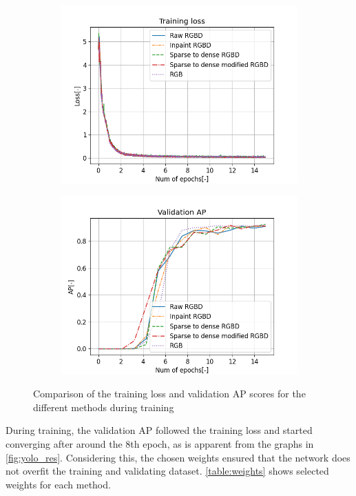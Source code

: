 \documentclass[twoside]{ctuthesis}
\theoremstyle{plain}
\theoremstyle{definition}
\theoremstyle{note}
\begin{document}
\begin{figure}
	\centering
	\begin{subfigure}[b]{0.7\textwidth}
		\centering
		\includegraphics[width=\textwidth]{train_loss.png}
	\end{subfigure}
	\hfill
	\begin{subfigure}[b]{0.7\textwidth}
		\centering
		\includegraphics[width=\textwidth]{validation_mAP.png}
	\end{subfigure}
	\caption{Comparison of the training loss and validation AP scores for the different methods during training}
	\label{fig:yolo_res}
\end{figure}
During training, the validation AP followed the training loss and started converging after around the 8th epoch, as is apparent from the graphs in \autoref{fig:yolo_res}. Considering this, the chosen weights ensured that the network does not overfit the training and validating dataset. \autoref{table:weights} shows selected weights for each method.
\end{document}
